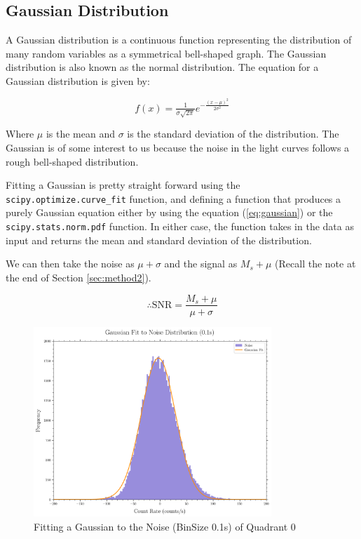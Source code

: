 \documentclass[11pt]{book} %
\begin{document}
\subsection{Gaussian Distribution}

A Gaussian distribution is a continuous function representing the distribution of many random variables as a symmetrical bell-shaped graph. The Gaussian distribution is also known as the normal distribution. The equation for a Gaussian distribution is given by:

\begin{equation} \label{eq:gaussian}
    f(x) = \tfrac{1}{\sigma\sqrt{2\pi}}e^{-\tfrac{(x-\mu)^2}{2\sigma^2}}
\end{equation}

Where $\mu$ is the mean and $\sigma$ is the standard deviation of the distribution. The Gaussian is of some interest to us because the noise in the light curves follows a rough bell-shaped distribution. 

Fitting a Gaussian is pretty straight forward using the \lstinline[language=Python]{scipy.optimize.curve_fit} function, and defining a function that produces a purely Gaussian equation either by using the equation (\ref{eq:gaussian}) or the \lstinline[language=Python]{scipy.stats.norm.pdf} function. In either case, the function takes in the data as input and returns the mean and standard deviation of the distribution. 

We can then take the noise as $\mu+\sigma$ and the signal as $M_s+\mu$ (Recall the note at the end of Section \ref{sec:method2}).

\begin{equation}
    \therefore \text{SNR} = \frac{M_s+\mu}{\mu+\sigma}
\end{equation}

\begin{figure}[H]
    \centering
    \includegraphics[width=0.8\textwidth]{Pictures/gaussian_fit.png}
    \caption{Fitting a Gaussian to the Noise (BinSize 0.1s) of Quadrant 0}
\end{figure}
\end{document}
